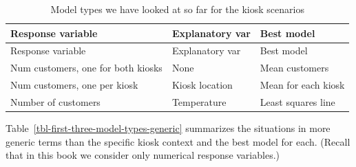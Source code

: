 \documentclass[
  12pt,
  letterpaper,
  DIV=11,
  numbers=noendperiod]{scrreprt}
\begin{document}
\begin{longtable}[]{@{}
  >{\raggedright\arraybackslash}p{}
  >{\raggedright\arraybackslash}p{}
  >{\raggedright\arraybackslash}p{}@{}}
\caption{Model types we have looked at so far for the kiosk
scenarios}\label{tbl-first-three-model-types-kiosk-context}\tabularnewline
\toprule\noalign{}
\begin{minipage}[b]{\linewidth}\raggedright
Response variable
\end{minipage} & \begin{minipage}[b]{\linewidth}\raggedright
Explanatory var
\end{minipage} & \begin{minipage}[b]{\linewidth}\raggedright
Best model
\end{minipage} \\
\midrule\noalign{}
\endfirsthead
\toprule\noalign{}
\begin{minipage}[b]{\linewidth}\raggedright
Response variable
\end{minipage} & \begin{minipage}[b]{\linewidth}\raggedright
Explanatory var
\end{minipage} & \begin{minipage}[b]{\linewidth}\raggedright
Best model
\end{minipage} \\
\midrule\noalign{}
\endhead
\bottomrule\noalign{}
\endlastfoot
Num customers, one for both kiosks & None & Mean customers \\
Num customers, one per kiosk & Kiosk location & Mean for each kiosk \\
Number of customers & Temperature & Least squares line \\
\end{longtable}

Table~\ref{tbl-first-three-model-types-generic} summarizes the
situations in more generic terms than the specific kiosk context and the
best model for each. (Recall that in this book we consider only
numerical response variables.)
\end{document}
